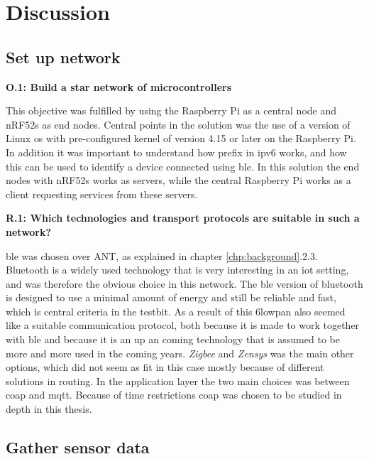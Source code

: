 \chapter{Discussion}
\label{chp:dataAnalysis}

\section{Set up network}

\noindent \textbf{O.1: Build a star network of microcontrollers}

\noindent  This objective was fulfilled by using the Raspberry Pi as a central node and nRF52s as end nodes. Central points in the solution was the use of a version of Linux \gls{os} with pre-configured kernel of version 4.15 or later on the \gls{Raspberry Pi}. In addition it was important to understand how prefix in \gls{ipv6} works, and how this can be used to identify a device connected using \gls{ble}. In this solution the end nodes with \glspl{nRF52} works as servers, while the central Raspberry Pi works as a client requesting services from these servers. 


\noindent \textbf{R.1: Which technologies and transport protocols are suitable in such a network?}

\noindent \gls{ble} was chosen over ANT, as explained in chapter \ref{chp:background}.2.3. Bluetooth is a widely used technology that is very interesting in an \gls{iot} setting, and was therefore the obvious choice in this network. The \gls{ble} version of bluetooth is designed to use a minimal amount of energy and still be reliable and fast, which is central criteria in the testbit. As a result of this \gls{6lowpan} also seemed like a suitable communication protocol, both because it is made to work together with \gls{ble} and because it is an up an coming technology that is assumed to be more and more used in the coming years. \textit{Zigbee} and \textit{Zensys} was the main other options, which did not seem as fit in this case mostly because of different solutions in routing. In the application layer the two main choices was between \gls{coap} and \gls{mqtt}. Because of time restrictions \gls{coap} was chosen to be studied in depth in this thesis. 

\newpage


\section{Gather sensor data}

